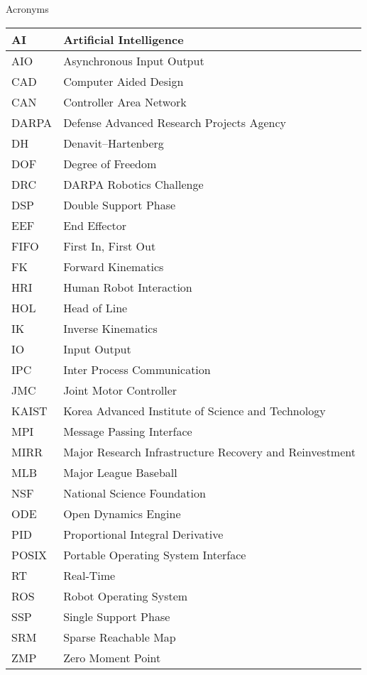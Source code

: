\Large
\centering
Acronyms\\
\normalsize
\begin{longtable}{l | l}
\hline
AI & Artificial Intelligence\\
\hline
AIO & Asynchronous Input Output\\
\hline
CAD & Computer Aided Design\\
\hline
CAN & Controller Area Network \\
\hline
DARPA  &  Defense Advanced Research Projects Agency\\
\hline 
DH & Denavit–Hartenberg \\
\hline
DOF & Degree of Freedom \\
\hline
DRC  & DARPA Robotics Challenge \\
\hline
DSP & Double Support Phase\\
\hline
EEF  & End Effector\\
\hline
FIFO & First In, First Out\\
\hline
FK & Forward Kinematics\\
\hline
HRI & Human Robot Interaction\\
\hline
HOL & Head of Line\\
\hline
IK & Inverse Kinematics\\ 
\hline
IO & Input Output\\
\hline
IPC & Inter Process Communication \\
\hline
JMC & Joint Motor Controller\\
\hline
KAIST & Korea Advanced Institute of Science and Technology \\
\hline
MPI & Message Passing Interface\\
\hline
MIRR & Major Research Infrastructure Recovery and Reinvestment\\
\hline
MLB & Major League Baseball\\
\hline
NSF & National Science Foundation \\
\hline
ODE & Open Dynamics Engine\\
\hline
PID & Proportional Integral Derivative\\
\hline
POSIX & Portable Operating System Interface\\
\hline
RT & Real-Time\\
\hline
ROS & Robot Operating System\\
\hline
SSP & Single Support Phase\\
\hline
SRM & Sparse Reachable Map \\
\hline 
ZMP & Zero Moment Point\\
\hline
\end{longtable}
